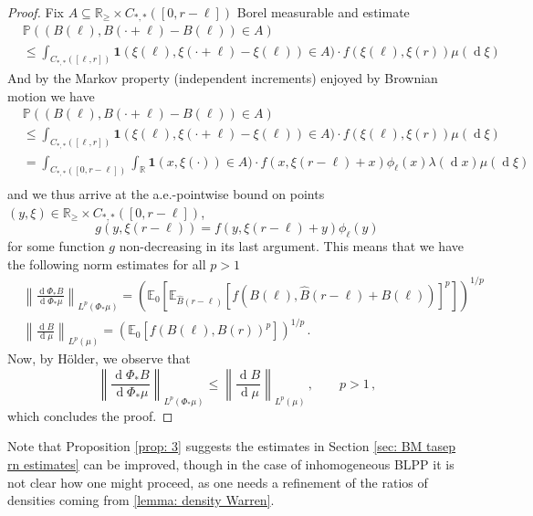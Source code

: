 \documentclass[11pt, reqno]{amsart}
\numberwithin{equation}{section}
\newcommand{\R}{\ensuremath{\mathbb{R}}}
\newcommand{\PP}{\ensuremath{\mathbb{P}}}
\newcommand{\norm}[1]{\left\lVert#1\right\rVert}
\newcommand{\diff}{\ensuremath{\operatorname{d}\!}}
\begin{document}
\begin{proof}
Fix $A\subseteq \R_\ge\times C_{*,*}([0,r-\ell])$ Borel measurable and estimate
\begin{equation*}
    \begin{array}{ll}
     & \PP((B(\ell), B(\cdot + \ell)-B(\ell))\in A) \\
     & \le \displaystyle\int_{C_{*,*}([\ell,r])} \mathbf{1}(\xi(\ell), \xi(\cdot+\ell)-\xi(\ell))\in A)\cdot f(\xi(\ell), \xi(r))\mu(\diff \xi)
\end{array}
\end{equation*}
And by the Markov property (independent increments) enjoyed by Brownian motion we have
\begin{equation*}
    \begin{array}{ll}
     & \PP((B(\ell), B(\cdot + \ell)-B(\ell))\in A) \\
     & \le \displaystyle\int_{C_{*,*}([\ell,r])} \mathbf{1}(\xi(\ell), \xi(\cdot+\ell)-\xi(\ell))\in A)\cdot f(\xi(\ell), \xi(r))\mu(\diff \xi)\\
     & = \displaystyle\int_{C_{*,*}([0,r-\ell])}\int_{\R} \mathbf{1}(x, \xi(\cdot))\in A)\cdot f(x, \xi(r-\ell)+x)\phi_{\ell}(x)\lambda(\diff x)\mu(\diff \xi)\\
\end{array}
\end{equation*}
and we thus arrive at the a.e.-pointwise bound on points $(y, \xi)\in \R_\ge\times C_{*,*}([0,r-\ell])$,
$$
g(y,\xi(r-\ell)) = f(y, \xi(r-\ell)+y)\phi_{\ell}(y)
$$
for some function $g$ non-decreasing in its last argument. This means that we have the following norm estimates for all $p>1$
\begin{equation*}
\begin{array}{ll}
    &\norm{\frac{\diff \Phi_* B}{\diff \Phi_*\mu}}_{L^p(\Phi_*\mu)} = \left(\mathbb{E}_0[\mathbb{E}_{\hat B (r-\ell)}[f(B(\ell), \hat B(r-\ell)+ B(\ell))]^p]\right)^{1/p}\\
    &\norm{\frac{\diff  B}{\diff \mu}}_{L^p(\mu)} = \left(\mathbb{E}_0[f(B(\ell), B(r))^p]\right)^{1/p}\,.
\end{array}
\end{equation*}
Now, by H\"{o}lder, we observe that
\[
\norm{\frac{\diff \Phi_* B}{\diff \Phi_*\mu}}_{L^p(\Phi_*\mu)}\le \norm{\frac{\diff  B}{\diff \mu}}_{L^p(\mu)}\,,\qquad p>1\,,
\]
which concludes the proof.
\end{proof}

Note that Proposition \ref{prop: 3} suggests the estimates in Section \ref{sec: BM tasep rn estimates} can be improved, though in the case of inhomogeneous BLPP it is not clear how one might proceed, as one needs a refinement of the ratios of densities coming from \ref{lemma: density Warren}.
\end{document}

